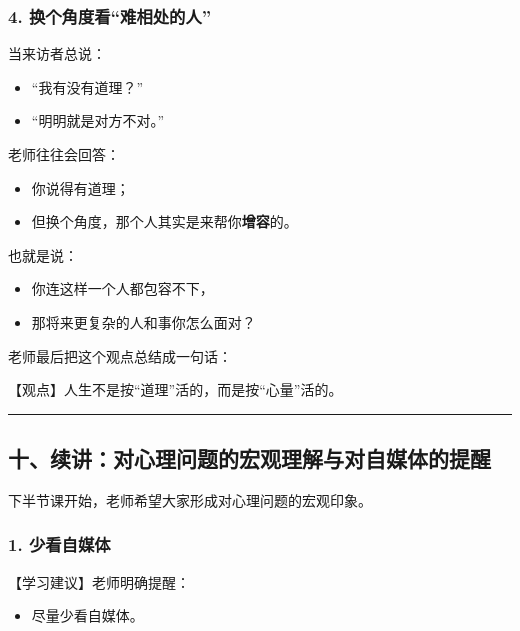 \documentclass[
  chinese,
  9pt,
  a4paper,
]{ctexart}
\providecommand{\tightlist}{%
  \setlength{\itemsep}{0pt}\setlength{\parskip}{0pt}}
\begin{document}
\subsubsection{4.
换个角度看``难相处的人''}\label{ux6362ux4e2aux89d2ux5ea6ux770bux96beux76f8ux5904ux7684ux4eba}

当来访者总说：

\begin{itemize}
\tightlist
\item
  ``我有没有道理？''
\item
  ``明明就是对方不对。''
\end{itemize}

老师往往会回答：

\begin{itemize}
\tightlist
\item
  你说得有道理；
\item
  但换个角度，那个人其实是来帮你\textbf{增容}的。
\end{itemize}

也就是说：

\begin{itemize}
\tightlist
\item
  你连这样一个人都包容不下，
\item
  那将来更复杂的人和事你怎么面对？
\end{itemize}

老师最后把这个观点总结成一句话：

【观点】人生不是按``道理''活的，而是按``心量''活的。

\begin{center}\rule{0.5\linewidth}{0.5pt}\end{center}

\subsection{十、续讲：对心理问题的宏观理解与对自媒体的提醒}\label{ux5341ux7eedux8bb2ux5bf9ux5fc3ux7406ux95eeux9898ux7684ux5b8fux89c2ux7406ux89e3ux4e0eux5bf9ux81eaux5a92ux4f53ux7684ux63d0ux9192}

下半节课开始，老师希望大家形成对心理问题的宏观印象。

\subsubsection{1. 少看自媒体}\label{ux5c11ux770bux81eaux5a92ux4f53}

【学习建议】老师明确提醒：

\begin{itemize}
\tightlist
\item
  尽量少看自媒体。
\end{itemize}
\end{document}
